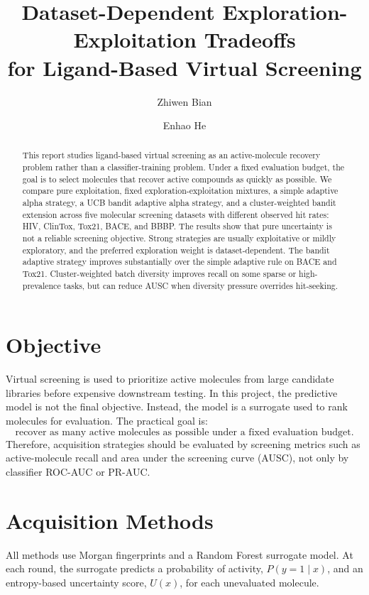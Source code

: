 \documentclass[10pt]{article}
\title{Dataset-Dependent Exploration-Exploitation Tradeoffs\\for Ligand-Based Virtual Screening}
\author{Zhiwen Bian \and Enhao He}
\date{}
\begin{document}
\maketitle

\begin{abstract}
This report studies ligand-based virtual screening as an active-molecule recovery problem rather than a classifier-training problem. Under a fixed evaluation budget, the goal is to select molecules that recover active compounds as quickly as possible. We compare pure exploitation, fixed exploration-exploitation mixtures, a simple adaptive alpha strategy, a UCB bandit adaptive alpha strategy, and a cluster-weighted bandit extension across five molecular screening datasets with different observed hit rates: HIV, ClinTox, Tox21, BACE, and BBBP. The results show that pure uncertainty is not a reliable screening objective. Strong strategies are usually exploitative or mildly exploratory, and the preferred exploration weight is dataset-dependent. The bandit adaptive strategy improves substantially over the simple adaptive rule on BACE and Tox21. Cluster-weighted batch diversity improves recall on some sparse or high-prevalence tasks, but can reduce AUSC when diversity pressure overrides hit-seeking.
\end{abstract}

\section{Objective}

Virtual screening is used to prioritize active molecules from large candidate libraries before expensive downstream testing. In this project, the predictive model is not the final objective. Instead, the model is a surrogate used to rank molecules for evaluation. The practical goal is:
\[
\text{recover as many active molecules as possible under a fixed evaluation budget.}
\]
Therefore, acquisition strategies should be evaluated by screening metrics such as active-molecule recall and area under the screening curve (AUSC), not only by classifier ROC-AUC or PR-AUC.

\section{Acquisition Methods}

All methods use Morgan fingerprints and a Random Forest surrogate model. At each round, the surrogate predicts a probability of activity, $P(y=1 \mid x)$, and an entropy-based uncertainty score, $U(x)$, for each unevaluated molecule.
\end{document}
